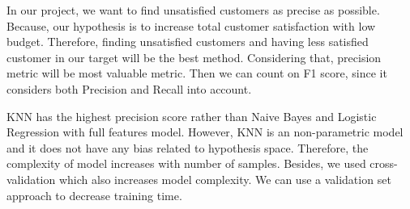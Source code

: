 \documentclass[
]{article}
\begin{document}
In our project, we want to find unsatisfied customers as precise as
possible. Because, our hypothesis is to increase total customer
satisfaction with low budget. Therefore, finding unsatisfied customers
and having less satisfied customer in our target will be the best
method. Considering that, precision metric will be most valuable metric.
Then we can count on F1 score, since it considers both Precision and
Recall into account.

KNN has the highest precision score rather than Naive Bayes and Logistic
Regression with full features model. However, KNN is an non-parametric
model and it does not have any bias related to hypothesis space.
Therefore, the complexity of model increases with number of samples.
Besides, we used cross-validation which also increases model complexity.
We can use a validation set approach to decrease training time.
\end{document}
